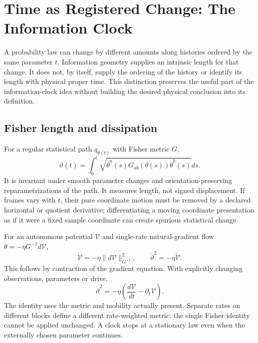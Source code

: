 \section{Time as Registered Change: The Information Clock}\label{sec:time_info}

A probability law can change by different amounts along histories ordered by the same parameter $t$. Information geometry supplies an intrinsic length for that change. It does not, by itself, supply the ordering of the history or identify its length with physical proper time. This distinction preserves the useful part of the information-clock idea without building the desired physical conclusion into its definition.

\subsection{Fisher length and dissipation}\label{sec:fisher_arc_length}
For a regular statistical path $q_{\theta(t)}$ with Fisher metric $G$,
\begin{equation}
\vartheta(t)=\int_0^t
\sqrt{\dot\theta^a(s)G_{ab}(\theta(s))\dot\theta^b(s)}ds.
\label{eq:fisher_clock}
\end{equation}
It is invariant under smooth parameter changes and orientation-preserving reparametrizations of the path. It measures length, not signed displacement. If frames vary with $t$, their pure coordinate motion must be removed by a declared horizontal or quotient derivative; differentiating a moving coordinate presentation as if it were a fixed sample coordinate can create spurious statistical change.

For an autonomous potential $\mathcal V$ and single-rate natural-gradient flow $\dot\theta=-\eta G^{-1}d\mathcal V$,
\begin{equation}
\dot{\mathcal V}=-\eta\|d\mathcal V\|_{G^{-1}}^2,\qquad
\dot\vartheta^2=-\eta\dot{\mathcal V}.
\label{eq:clock_dissipation}
\end{equation}
This follows by contraction of the gradient equation. With explicitly changing observations, parameters or drive,
\begin{equation}
\dot\vartheta^2=-\eta\left(\frac{d\mathcal V}{dt}-\partial_t\mathcal V\right).
\label{eq:clock_driven}
\end{equation}
The identity uses the metric and mobility actually present. Separate rates on different blocks define a different rate-weighted metric; the single Fisher identity cannot be applied unchanged. A clock stops at a stationary law even when the externally chosen parameter continues.

